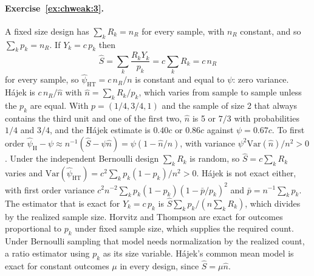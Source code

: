 \paragraph{Exercise~\ref{ex:chweak:3}.} A fixed size design has $\sum_k R_k = n_R$ for every sample, with $n_R$ constant, and so $\sum_k p_k = n_R$. If $Y_k = c\,p_k$ then
\[
\hat S = \sum_k \frac{R_kY_k}{p_k} = c\sum_k R_k = c\,n_R
\]
for every sample, so $\hat\psi_{\mathrm{HT}} = c\,n_R/n$ is constant and equal to $\psi$: zero variance. H\'ajek is $c\,n_R/\hat n$ with $\hat n = \sum_k R_k/p_k$, which varies from sample to sample unless the $p_k$ are equal. With $p = (1/4, 3/4, 1)$ and the sample of size 2 that always contains the third unit and one of the first two, $\hat n$ is 5 or $7/3$ with probabilities $1/4$ and $3/4$, and the H\'ajek estimate is $0.40c$ or $0.86c$ against $\psi = 0.67c$. To first order $\hat\psi_{\mathrm{H}} - \psi \approx n^{-1}(\hat S - \psi\hat n) = \psi(1 - \hat n/n)$, with variance $\psi^2\mathrm{Var}(\hat n)/n^2 > 0$. Under the independent Bernoulli design $\sum_k R_k$ is random, so $\hat S = c\sum_k R_k$ varies and $\mathrm{Var}(\hat\psi_{\mathrm{HT}}) = c^2\sum_k p_k(1 - p_k)/n^2 > 0$. H\'ajek is not exact either, with first order variance $c^2n^{-2}\sum_k p_k(1 - p_k)(1 - \bar p/p_k)^2$ and $\bar p = n^{-1}\sum_k p_k$. The estimator that is exact for $Y_k = c\,p_k$ is $\hat S\sum_k p_k/(n\sum_k R_k)$, which divides by the realized sample size. Horvitz and Thompson are exact for outcomes proportional to $p_k$ under fixed sample size, which supplies the required count. Under Bernoulli sampling that model needs normalization by the realized count, a ratio estimator using $p_k$ as its size variable. H\'ajek's common mean model is exact for constant outcomes $\mu$ in every design, since $\hat S=\mu\hat n$.

